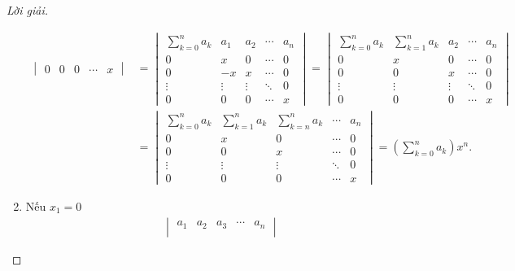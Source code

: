 \documentclass[class=nhvh-linear-algebra,crop=false]{standalone}
\begin{document}
\begin{proof}[Lời giải]
\begin{enumerate}[label = (\alph*)]
\begin{align*}
\begin{vmatrix}
				      0      & 0      & 0      & \cdots & x
			      \end{vmatrix}
			       & =
			      \begin{vmatrix}
				      \sum^{n}_{k=0}a_{k} & a_{1}  & a_{2}  & \cdots & a_{n} \\
				      0                   & x      & 0      & \cdots & 0     \\
				      0                   & -x     & x      & \cdots & 0     \\
				      \vdots              & \vdots & \vdots & \ddots & 0     \\
				      0                   & 0      & 0      & \cdots & x
			      \end{vmatrix}
			      =
			      \begin{vmatrix}
				      \sum^{n}_{k=0}a_{k} & \sum^{n}_{k=1}a_{k} & a_{2}  & \cdots & a_{n} \\
				      0                   & x                   & 0      & \cdots & 0     \\
				      0                   & 0                   & x      & \cdots & 0     \\
				      \vdots              & \vdots              & \vdots & \ddots & 0     \\
				      0                   & 0                   & 0      & \cdots & x
			      \end{vmatrix} \\
			       & =
			      \begin{vmatrix}
				      \sum^{n}_{k=0}a_{k} & \sum^{n}_{k=1}a_{k} & \sum^{n}_{k=n}a_{k} & \cdots & a_{n} \\
				      0                   & x                   & 0                   & \cdots & 0     \\
				      0                   & 0                   & x                   & \cdots & 0     \\
				      \vdots              & \vdots              & \vdots              & \ddots & 0     \\
				      0                   & 0                   & 0                   & \cdots & x
			      \end{vmatrix}
			      = \left(\sum^{n}_{k=0}a_{k}\right)x^{n}.
		      \end{align*}
		      \endgroup{}
		\item Nếu $x_{1} = 0$
		      \begin{align*}
			      \begin{vmatrix}
				      a_{1}  & a_{2}  & a_{3}  & \cdots & a_{n}  \\

\end{vmatrix}
\end{align*}
\end{enumerate}
\end{proof}
\end{document}
